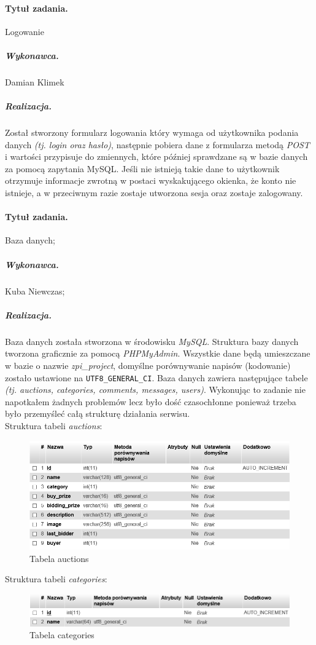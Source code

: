 \documentclass[a4paper]{article}
\begin{document}
	\paragraph{Tytuł zadania.} Logowanie 
	\subparagraph{Wykonawca.} Damian Klimek 
	\subparagraph{Realizacja.} Został stworzony formularz logowania który wymaga od użytkownika podania danych \emph{(tj. login oraz hasło)}, następnie pobiera dane z formularza metodą \emph{POST} i wartości przypisuje do zmiennych, które później sprawdzane są w bazie danych za pomocą zapytania MySQL. Jeśli nie istnieją takie dane to użytkownik otrzymuje informacje zwrotną w postaci wyskakującego okienka, że konto nie istnieje, a w przeciwnym razie zostaje utworzona sesja oraz zostaje zalogowany.
	
	\paragraph{Tytuł zadania.} Baza danych;
	\subparagraph{Wykonawca.} Kuba Niewczas;
	\subparagraph{Realizacja.} Baza danych została stworzona w środowisku \emph{MySQL}. Struktura bazy danych tworzona graficznie za pomocą \emph{PHPMyAdmin}. Wszystkie dane będą umieszczane w bazie o nazwie \emph{zpi\_project}, domyślne porównywanie napisów (kodowanie) zostało ustawione na \verb|UTF8_GENERAL_CI|. Baza danych zawiera następujące tabele \emph{(tj. auctions, categories, comments, messages, users)}. Wykonując to zadanie nie napotkałem żadnych problemów lecz było dość czasochłonne ponieważ trzeba było przemyśleć całą strukturę działania serwisu.\\
	
	Struktura tabeli \emph{auctions}:
	
	\begin{figure}[h]
		\centering
		\includegraphics[width=12cm]{images/auctions.jpg}
		\caption{Tabela auctions}
	\end{figure}
	
	Struktura tabeli \emph{categories}:
	
	\begin{figure}[h]
		\centering
		\includegraphics[width=12cm]{images/categories.jpg}
		\caption{Tabela categories}
	\end{figure}
	
\end{document}
